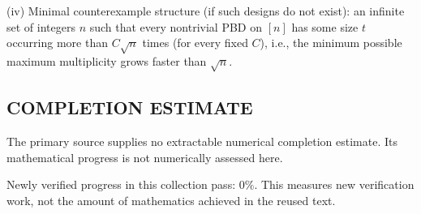 (iv) Minimal counterexample structure (if such designs do not exist): an infinite set of integers $n$ such that every nontrivial PBD on $[n]$ has some size $t$ occurring more than $C\sqrt n$ times (for every fixed $C$), i.e., the minimum possible maximum multiplicity grows faster than $\sqrt n$.




\subsection*{COMPLETION ESTIMATE}
The primary source supplies no extractable numerical completion estimate. Its mathematical progress is not numerically assessed here.

Newly verified progress in this collection pass: $0\%$. This measures new verification work, not the amount of mathematics achieved in the reused text.
